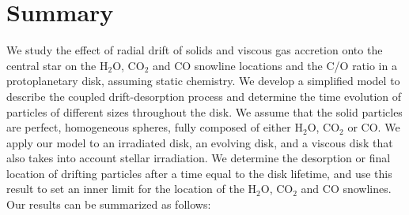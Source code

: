 \documentclass[apj]{emulateapj}
\begin{document}
\section{Summary}
\label{sec:summary}

We study the effect of radial drift of solids and viscous gas accretion onto the central star on the H$_2$O, CO$_2$ and CO snowline locations and the C/O ratio in a protoplanetary disk, assuming static chemistry. We develop a simplified model to describe the coupled drift-desorption process and determine the time evolution of particles of different sizes throughout the disk. We assume that the solid particles are perfect, homogeneous spheres, fully composed of either H$_2$O, CO$_2$ or CO. We apply our model to an irradiated disk, an evolving disk, and a viscous disk that also takes into account stellar irradiation. We determine the desorption or final location of drifting particles after a time equal to the disk lifetime, and use this result to set an inner limit for the location of the H$_2$O, CO$_2$ and CO snowlines. Our results can be summarized as follows:
\end{document}
